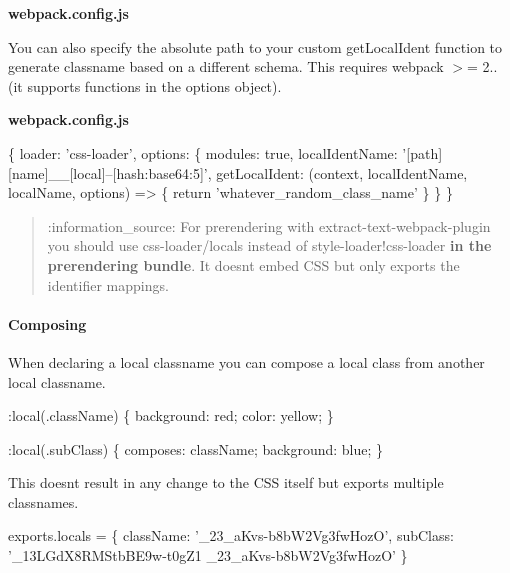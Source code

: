 {\bfseries webpack.\+config.\+js} 


You can also specify the absolute path to your custom {\ttfamily get\+Local\+Ident} function to generate classname based on a different schema. This requires {\ttfamily webpack $>$= 2..} (it supports functions in the {\ttfamily options} object).

{\bfseries webpack.\+config.\+js} 
\begin{DoxyCode}
\{
  loader: 'css-loader',
  options: \{
    modules: true,
    localIdentName: '[path][name]\_\_[local]--[hash:base64:5]',
    getLocalIdent: (context, localIdentName, localName, options) => \{
      return 'whatever\_random\_class\_name'
    \}
  \}
\}
\end{DoxyCode}


\begin{quote}
\+:information\+\_\+source\+: For prerendering with extract-\/text-\/webpack-\/plugin you should use {\ttfamily css-\/loader/locals} instead of {\ttfamily style-\/loader!css-\/loader} {\bfseries in the prerendering bundle}. It doesn\textquotesingle{}t embed C\+SS but only exports the identifier mappings. \end{quote}


\paragraph*{{\ttfamily Composing}}

When declaring a local classname you can compose a local class from another local classname.


\begin{DoxyCode}
:local(.className) \{
  background: red;
  color: yellow;
\}

:local(.subClass) \{
  composes: className;
  background: blue;
\}
\end{DoxyCode}


This doesn\textquotesingle{}t result in any change to the C\+SS itself but exports multiple classnames.


\begin{DoxyCode}
exports.locals = \{
  className: '\_23\_aKvs-b8bW2Vg3fwHozO',
  subClass: '\_13LGdX8RMStbBE9w-t0gZ1 \_23\_aKvs-b8bW2Vg3fwHozO'
\}
\end{DoxyCode}



